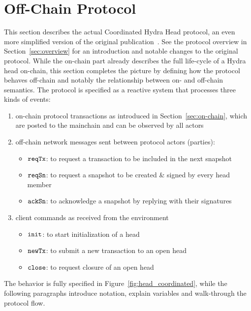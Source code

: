 \section{Off-Chain Protocol}\label{sec:offchain}

This section describes the actual Coordinated Hydra Head protocol, an even more
simplified version of the original publication~\cite{hydrahead20}. See the
protocol overview in Section~\ref{sec:overview} for an introduction and notable
changes to the original protocol. While the on-chain part already describes the
full life-cycle of a Hydra head on-chain, this section completes the picture by
defining how the protocol behaves off-chain and notably the relationship between
on- and off-chain semantics. The protocol is specified as a reactive system that
processes three kinds of events:
\begin{enumerate}
  \item on-chain protocol transactions as introduced in
        Section~\ref{sec:on-chain}, which are posted to the mainchain and can be
        observed by all actors
  \item off-chain network messages sent between protocol actors (parties):
    \begin{itemize}
      \item $\mathtt{reqTx}$: to request a transaction to be included in the next snapshot
      \item $\mathtt{reqSn}$: to request a snapshot to be created \& signed by every head member
      \item $\mathtt{ackSn}$: to acknowledge a snapshot by replying with their signatures
    \end{itemize}
  \item client commands as received from the environment
    \begin{itemize}
      \item $\mathtt{init}$: to start initialization of a head
      \item $\mathtt{newTx}$: to submit a new transaction to an open head
      \item $\mathtt{close}$: to request closure of an open head
    \end{itemize}
\end{enumerate}

The behavior is fully specified in Figure~\ref{fig:head_coordinated}, while the
following paragraphs introduce notation, explain variables and walk-through the
protocol flow.

